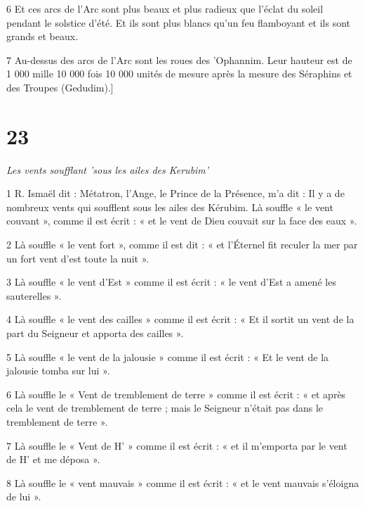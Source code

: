 \par 6 Et ces arcs de l'Arc sont plus beaux et plus radieux que l'éclat du soleil pendant le solstice d'été. Et ils sont plus blancs qu’un feu flamboyant et ils sont grands et beaux.

\par 7 Au-dessus des arcs de l'Arc sont les roues des 'Ophannim. Leur hauteur est de 1 000 mille 10 000 fois 10 000 unités de mesure après la mesure des Séraphins et des Troupes (Gedudim).]

\chapter{23}

\par \textit{Les vents soufflant 'sous les ailes des Kerubim'}

\par 1 R. Ismaël dit : Métatron, l'Ange, le Prince de la Présence, m'a dit : Il y a de nombreux vents qui soufflent sous les ailes des Kérubim. Là souffle « le vent couvant », comme il est écrit : « et le vent de Dieu couvait sur la face des eaux ».

\par 2 Là souffle « le vent fort », comme il est dit : « et l'Éternel fit reculer la mer par un fort vent d'est toute la nuit ».

\par 3 Là souffle « le vent d'Est » comme il est écrit : « le vent d'Est a amené les sauterelles ».

\par 4 Là souffle « le vent des cailles » comme il est écrit : « Et il sortit un vent de la part du Seigneur et apporta des cailles ».

\par 5 Là souffle « le vent de la jalousie » comme il est écrit : « Et le vent de la jalousie tomba sur lui ».

\par 6 Là souffle le « Vent de tremblement de terre » comme il est écrit : « et après cela le vent de tremblement de terre ; mais le Seigneur n'était pas dans le tremblement de terre ».

\par 7 Là souffle le « Vent de H' » comme il est écrit : « et il m'emporta par le vent de H' et me déposa ».

\par 8 Là souffle le « vent mauvais » comme il est écrit : « et le vent mauvais s'éloigna de lui ».

